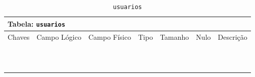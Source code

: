 \documentclass[12pt,a4paper]{article}
\begin{document}

\begin{center}
\begin{table}[h!]
	\caption{\texttt{usuarios}}
	\label{tabela:usuarios}
	\begin{tabular}{|p{1cm}|p{1.5cm}|p{1.25cm}|p{1.25cm}|p{1.75cm}|p{1.25cm}|p{4.5cm}|}\hline	
		\multicolumn{7}{|p{16cm}|}{\cellcolor{cinzaClaro}  \centering Tabela: \texttt{usuarios}} \\ \hline %
		{\small Chaves} & {\small Campo Lógico} & {\small Campo Físico} & {\small Tipo} & {\small Tamanho} & {\small Nulo} & {\small Descrição}\\\hline %
		
		{\tiny } & {\tiny } & {\tiny } & {\tiny } & {\tiny } & {\tiny } &{\tiny }\\\hline
		{\tiny } & {\tiny } & {\tiny } & {\tiny } & {\tiny } & {\tiny } &{\tiny }\\\hline
		{\tiny } & {\tiny } & {\tiny } & {\tiny } & {\tiny } & {\tiny } &{\tiny }\\\hline
		{\tiny } & {\tiny } & {\tiny } & {\tiny } & {\tiny } & {\tiny } &{\tiny }\\\hline
		{\tiny } & {\tiny } & {\tiny } & {\tiny } & {\tiny } & {\tiny } &{\tiny }\\\hline
		{\tiny } & {\tiny } & {\tiny } & {\tiny } & {\tiny } & {\tiny } &{\tiny }\\\hline
		{\tiny } & {\tiny } & {\tiny } & {\tiny } & {\tiny } & {\tiny } &{\tiny }\\\hline
		{\tiny } & {\tiny } & {\tiny } & {\tiny } & {\tiny } & {\tiny } &{\tiny }\\\hline
		{\tiny } & {\tiny } & {\tiny } & {\tiny } & {\tiny } & {\tiny } &{\tiny }\\\hline		
		{\tiny } & {\tiny } & {\tiny } & {\tiny } & {\tiny } & {\tiny } &{\tiny }\\\hline
		{\tiny } & {\tiny } & {\tiny } & {\tiny } & {\tiny } & {\tiny } &{\tiny }\\\hline
		
			
	\end{tabular}
\end{table}	
\end{center}
\end{document}
